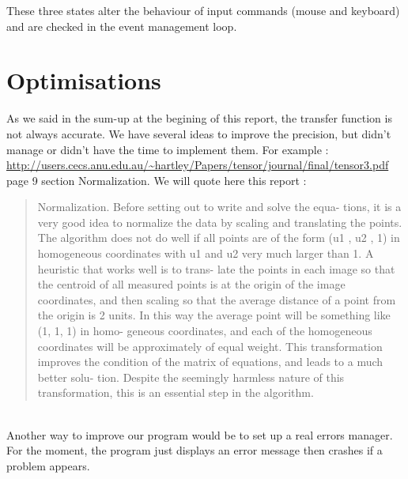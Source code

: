 \documentclass[a4paper,10pt]{report}
\begin{document}
These three states alter the behaviour of input commands (mouse and keyboard) and are checked in the event management loop.


\section{Optimisations}

As we said in the sum-up at the begining of this report, the transfer function is not always accurate.
We have several ideas to improve the precision, but didn't manage or didn't have the time to implement them. For example : \url{http://users.cecs.anu.edu.au/~hartley/Papers/tensor/journal/final/tensor3.pdf} page 9 section Normalization.
We will quote here this report :
\begin{quotation}
  Normalization. Before setting out to write and solve the equa-
  tions, it is a very good idea to normalize the data by scaling and
  translating the points. The algorithm does not do well if all points
  are of the form (u1 , u2 , 1) in homogeneous coordinates with u1 and
  u2 very much larger than 1. A heuristic that works well is to trans-
  late the points in each image so that the centroid of all measured
  points is at the origin of the image coordinates, and then scaling so
  that the average distance of a point from the origin is 2 units. In
  this way the average point will be something like (1, 1, 1) in homo-
  geneous coordinates, and each of the homogeneous coordinates will
  be approximately of equal weight. This transformation improves the
  condition of the matrix of equations, and leads to a much better solu-
  tion. Despite the seemingly harmless nature of this transformation,
  this is an essential step in the algorithm.
\end{quotation}
\\

Another way to improve our program would be to set up a real errors manager. For the moment, the program just
displays an error message then crashes if a problem appears.
\end{document}
